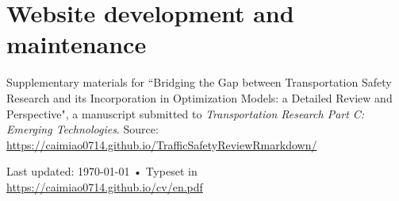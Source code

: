 \documentclass[11pt, a4paper]{article}
\newcommand{\years}[1]{\marginnote{\scriptsize #1}}
\begin{document}
\section*{Website development and maintenance}
\years{2019}Supplementary materials for ``Bridging the Gap between Transportation Safety Research and its Incorporation in Optimization Models: a Detailed Review and Perspective", a manuscript submitted to \emph{Transportation Research Part C: Emerging Technologies}. Source: \href{https://caimiao0714.github.io/TrafficSafetyReviewRmarkdown/}{https://caimiao0714.github.io/TrafficSafetyReviewRmarkdown/}





\vfill{}

\begin{center}
{\scriptsize  Last updated: \today\- •\- 
Typeset in \href{https://caimiao0714.github.io/cv/en.pdf}{
\XeTeX }\\
\href{https://caimiao0714.github.io/cv/en.pdf}{https://caimiao0714.github.io/cv/en.pdf}}
\end{center}
\end{document}

